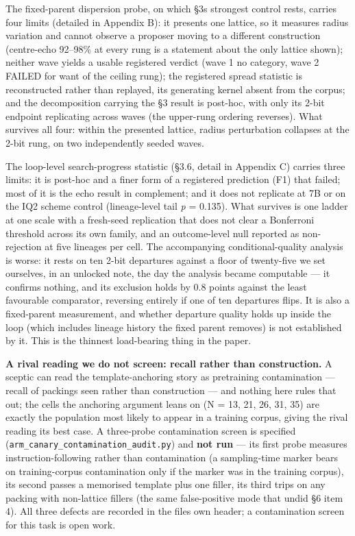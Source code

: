 The fixed-parent dispersion probe, on which §3\textquotesingle s strongest control rests, carries four limits (detailed in Appendix B): it presents one lattice, so it measures radius variation and cannot observe a proposer moving to a different construction (centre-echo 92--98\% at every rung is a statement about the only lattice shown); neither wave yields a usable registered verdict (wave 1 no category, wave 2 FAILED for want of the ceiling rung); the registered spread statistic is reconstructed rather than replayed, its generating kernel absent from the corpus; and the decomposition carrying the §3 result is post-hoc, with only its 2-bit endpoint replicating across waves (the upper-rung ordering reverses). What survives all four: within the presented lattice, radius perturbation collapses at the 2-bit rung, on two independently seeded waves.

The loop-level search-progress statistic (§3.6, detail in Appendix C) carries three limits: it is post-hoc and a finer form of a registered prediction (F1) that failed; most of it is the echo result in complement; and it does not replicate at 7B or on the IQ2 scheme control (lineage-level tail \emph{p} = 0.135). What survives is one ladder at one scale with a fresh-seed replication that does not clear a Bonferroni threshold across its own family, and an outcome-level null reported as non-rejection at five lineages per cell. The accompanying conditional-quality analysis is worse: it rests on ten 2-bit departures against a floor of twenty-five we set ourselves, in an unlocked note, the day the analysis became computable --- it confirms nothing, and its exclusion holds by 0.8 points against the least favourable comparator, reversing entirely if one of ten departures flips. It is also a fixed-parent measurement, and whether departure quality holds up inside the loop (which includes lineage history the fixed parent removes) is not established by it. This is the thinnest load-bearing thing in the paper.

\textbf{A rival reading we do not screen: recall rather than construction.} A sceptic can read the template-anchoring story as pretraining contamination --- recall of packings seen rather than construction --- and nothing here rules that out; the cells the anchoring argument leans on (N = 13, 21, 26, 31, 35) are exactly the population most likely to appear in a training corpus, giving the rival reading its best case. A three-probe contamination screen is specified (\texttt{arm\_canary\_contamination\_audit.py}) and \textbf{not run} --- its first probe measures instruction-following rather than contamination (a sampling-time marker bears on training-corpus contamination only if the marker was in the training corpus), its second passes a memorised template plus one filler, its third trips on any packing with non-lattice fillers (the same false-positive mode that undid §6 item 4). All three defects are recorded in the file\textquotesingle s own header; a contamination screen for this task is open work.

